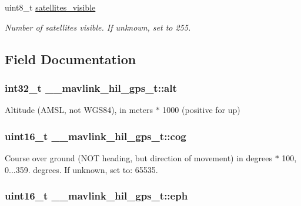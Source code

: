 \begin{DoxyCompactItemize}
uint8\+\_\+t \hyperlink{struct____mavlink__hil__gps__t_a9128f6bd8c708d5990adbfce55365577}{satellites\+\_\+visible}
\begin{DoxyCompactList}\small\item\em Number of satellites visible. If unknown, set to 255. \end{DoxyCompactList}\end{DoxyCompactItemize}


\subsection{Field Documentation}
\hypertarget{struct____mavlink__hil__gps__t_a9d9f5ccc1ded23c02b7a7ed760c66a73}{
\subsubsection[{alt}]{\setlength{\rightskip}{0pt plus 5cm}int32\+\_\+t \+\_\+\+\_\+mavlink\+\_\+hil\+\_\+gps\+\_\+t\+::alt}}\label{struct____mavlink__hil__gps__t_a9d9f5ccc1ded23c02b7a7ed760c66a73}


Altitude (A\+M\+S\+L, not W\+G\+S84), in meters $\ast$ 1000 (positive for up) 

\hypertarget{struct____mavlink__hil__gps__t_a7a0d3eba01b2e7cb3fb52d10192a7881}{
\subsubsection[{cog}]{\setlength{\rightskip}{0pt plus 5cm}uint16\+\_\+t \+\_\+\+\_\+mavlink\+\_\+hil\+\_\+gps\+\_\+t\+::cog}}\label{struct____mavlink__hil__gps__t_a7a0d3eba01b2e7cb3fb52d10192a7881}


Course over ground (N\+O\+T heading, but direction of movement) in degrees $\ast$ 100, 0...359. degrees. If unknown, set to\+: 65535. 

\hypertarget{struct____mavlink__hil__gps__t_a1886825c99c4312c1c5f5e2e42c8ebc2}{
\subsubsection[{eph}]{\setlength{\rightskip}{0pt plus 5cm}uint16\+\_\+t \+\_\+\+\_\+mavlink\+\_\+hil\+\_\+gps\+\_\+t\+::eph}}\label{struct____mavlink__hil__gps__t_a1886825c99c4312c1c5f5e2e42c8ebc2}



